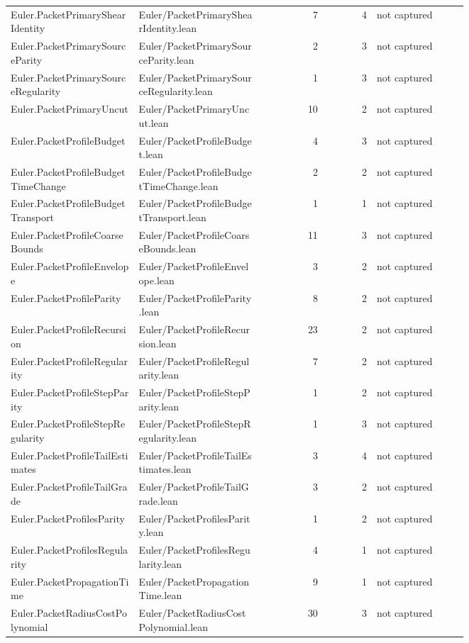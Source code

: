 \documentclass[10pt]{article}
\begin{document}
\begin{longtable}{p{0.28\linewidth}p{0.27\linewidth}r r p{0.20\linewidth}}
Euler.PacketPrimaryShearIdentity & Euler/PacketPrimaryShearIdentity.lean & 7 & 4 & not captured\\
Euler.PacketPrimarySourceParity & Euler/PacketPrimarySourceParity.lean & 2 & 3 & not captured\\
Euler.PacketPrimarySourceRegularity & Euler/PacketPrimarySourceRegularity.lean & 1 & 3 & not captured\\
Euler.PacketPrimaryUncut & Euler/PacketPrimaryUncut.lean & 10 & 2 & not captured\\
Euler.PacketProfileBudget & Euler/PacketProfileBudget.lean & 4 & 3 & not captured\\
Euler.PacketProfileBudgetTimeChange & Euler/PacketProfileBudgetTimeChange.lean & 2 & 2 & not captured\\
Euler.PacketProfileBudgetTransport & Euler/PacketProfileBudgetTransport.lean & 1 & 1 & not captured\\
Euler.PacketProfileCoarseBounds & Euler/PacketProfileCoarseBounds.lean & 11 & 3 & not captured\\
Euler.PacketProfileEnvelope & Euler/PacketProfileEnvelope.lean & 3 & 2 & not captured\\
Euler.PacketProfileParity & Euler/PacketProfileParity.lean & 8 & 2 & not captured\\
Euler.PacketProfileRecursion & Euler/PacketProfileRecursion.lean & 23 & 2 & not captured\\
Euler.PacketProfileRegularity & Euler/PacketProfileRegularity.lean & 7 & 2 & not captured\\
Euler.PacketProfileStepParity & Euler/PacketProfileStepParity.lean & 1 & 2 & not captured\\
Euler.PacketProfileStepRegularity & Euler/PacketProfileStepRegularity.lean & 1 & 3 & not captured\\
Euler.PacketProfileTailEstimates & Euler/PacketProfileTailEstimates.lean & 3 & 4 & not captured\\
Euler.PacketProfileTailGrade & Euler/PacketProfileTailGrade.lean & 3 & 2 & not captured\\
Euler.PacketProfilesParity & Euler/PacketProfilesParity.lean & 1 & 2 & not captured\\
Euler.PacketProfilesRegularity & Euler/PacketProfilesRegularity.lean & 4 & 1 & not captured\\
Euler.PacketPropagationTime & Euler/PacketPropagationTime.lean & 9 & 1 & not captured\\
Euler.PacketRadiusCostPolynomial & Euler/PacketRadiusCostPolynomial.lean & 30 & 3 & not captured\\

\end{longtable}
\end{document}

